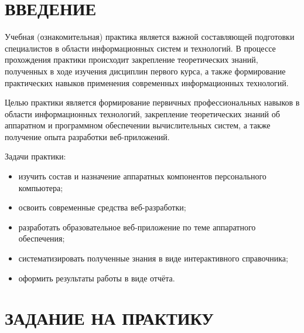 \documentclass[14pt,a4paper]{extarticle}
\begin{document}
\setcounter{page}{2}

\tableofcontents
\thispagestyle{empty}
\restoregeometry

\newpage
\section*{ВВЕДЕНИЕ}

Учебная (ознакомительная) практика является важной составляющей подготовки специалистов в области информационных систем и технологий. В процессе прохождения практики происходит закрепление теоретических знаний, полученных в ходе изучения дисциплин первого курса, а также формирование практических навыков применения современных информационных технологий.

Целью практики является формирование первичных профессиональных навыков в области информационных технологий, закрепление теоретических знаний об аппаратном и программном обеспечении вычислительных систем, а также получение опыта разработки веб-приложений.

Задачи практики:
\begin{itemize}
  \item изучить состав и назначение аппаратных компонентов персонального компьютера;
  \item освоить современные средства веб-разработки;
  \item разработать образовательное веб-приложение по теме аппаратного обеспечения;
  \item систематизировать полученные знания в виде интерактивного справочника;
  \item оформить результаты работы в виде отчёта.
\end{itemize}

\newpage
\section*{ЗАДАНИЕ НА ПРАКТИКУ}
\end{document}
